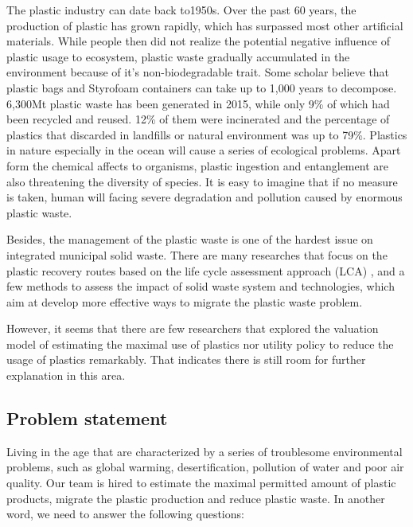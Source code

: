\documentclass{mcmthesis}
\begin{document}
The plastic industry can date back to1950s. Over the past 60 years, the production of plastic has grown rapidly, which has surpassed most other artificial materials\cite{Geyer}. While people then did not realize the potential negative influence of plastic usage to ecosystem, plastic waste gradually accumulated in the environment because of it’s non-biodegradable trait. Some scholar believe that plastic bags and Styrofoam containers can take up to 1,000 years to decompose\cite{Giacovelli}. 6,300Mt plastic waste has been generated in 2015, while only 9\% of which had been recycled and reused. 12\% of them were incinerated and the percentage of plastics that discarded in landfills or natural environment was up to 79\%\cite{Geyer}. Plastics in nature especially in the ocean will cause a series of ecological problems. Apart form the chemical affects to organisms, plastic ingestion and entanglement are also threatening the diversity of species\cite{LI}. It is easy to imagine that if no measure is taken, human will facing severe degradation and pollution caused by enormous plastic waste.

Besides, the management of the plastic waste is one of the hardest issue on integrated municipal solid waste. There are many researches that focus on the plastic recovery routes based on the life cycle assessment approach (LCA) \cite{Rigamonti}, and a few methods to assess the impact of solid waste system and technologies, which aim at develop more effective ways to migrate the plastic waste problem\cite{Kirkeby}.

However, it seems that there are few researchers that explored the valuation model of estimating the maximal use of plastics nor utility policy to reduce the usage of plastics remarkably. That indicates there is still room for further explanation in this area. 


\subsection{Problem statement}

Living in the age that are characterized by a series of  troublesome environmental problems, such as global warming, desertification, pollution of water and poor air quality. Our team is hired to estimate the maximal permitted amount of plastic products, migrate the plastic production and reduce plastic waste. In another word, we need to answer the following questions:
\end{document}

